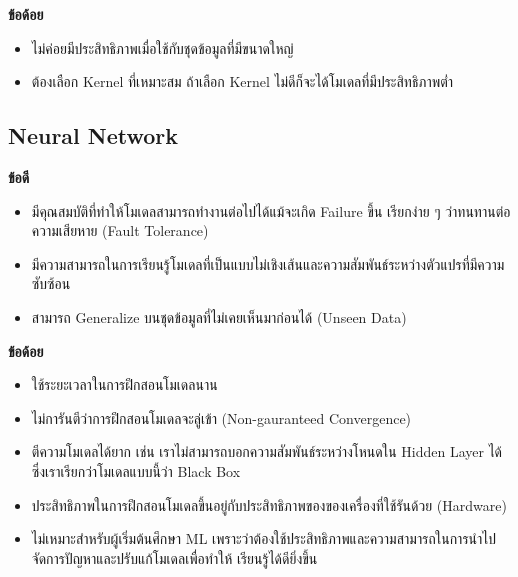 \noindent \textbf{ข้อด้อย}
\begin{itemize}[topsep=0pt]
    \item ไม่ค่อยมีประสิทธิภาพเมื่อใช้กับชุดข้อมูลที่มีขนาดใหญ่
    
    \item ต้องเลือก Kernel ที่เหมาะสม ถ้าเลือก Kernel ไม่ดีก็จะได้โมเดลที่มีประสิทธิภาพต่ำ
\end{itemize}

\subsection{Neural Network}
\label{ssec:pros_cons_nn}

\noindent \textbf{ข้อดี}
\begin{itemize}[topsep=0pt]
    \item มีคุณสมบัติที่ทำให้โมเดลสามารถทำงานต่อไปได้แม้จะเกิด Failure ขึ้น เรียกง่าย ๆ ว่าทนทานต่อความเสียหาย (Fault Tolerance)

    \item มีความสามารถในการเรียนรู้โมเดลที่เป็นแบบไม่เชิงเส้นและความสัมพันธ์ระหว่างตัวแปรที่มีความซับซ้อน
    
    \item สามารถ Generalize บนชุดข้อมูลที่ไม่เคยเห็นมาก่อนได้ (Unseen Data)
\end{itemize}

\noindent \textbf{ข้อด้อย}
\begin{itemize}[topsep=0pt]
    \item ใช้ระยะเวลาในการฝึกสอนโมเดลนาน
    
    \item ไม่การันตีว่าการฝึกสอนโมเดลจะลู่เข้า (Non-gauranteed Convergence)
    
    \item ตีความโมเดลได้ยาก เช่น เราไม่สามารถบอกความสัมพันธ์ระหว่างโหนดใน Hidden Layer ได้ ซึ่งเราเรียกว่าโมเดลแบบนี้ว่า Black 
    Box 

    \item ประสิทธิภาพในการฝึกสอนโมเดลขึ้นอยู่กับประสิทธิภาพของของเครื่องที่ใช้รันด้วย (Hardware)
    
    \item ไม่เหมาะสำหรับผู้เริ่มต้นศึกษา ML เพราะว่าต้องใช้ประสิทธิภาพและความสามารถในการนำไปจัดการปัญหาและปรับแก้โมเดลเพื่อทำให้%
    เรียนรู้ได้ดียิ่งขึ้น
\end{itemize}

